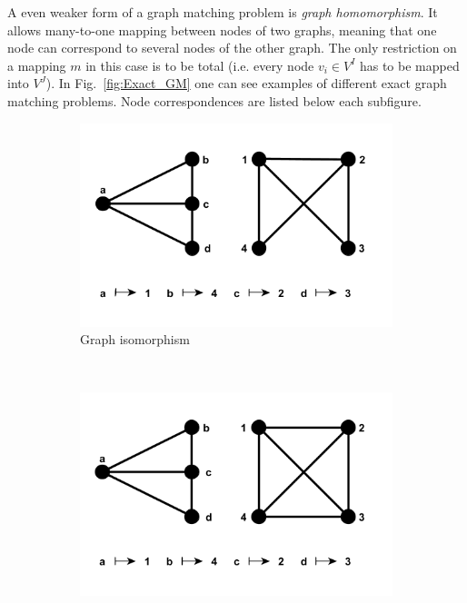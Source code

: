 A even weaker form of a graph matching problem is \emph{graph homomorphism}. It allows many-to-one mapping between nodes of two graphs, meaning that one node can correspond to several nodes of the other graph. The only restriction on a mapping $m$ in this case is to be total (i.e. every node $v_i\in V^I$ has to be mapped into $V^J$).
In Fig.~\ref{fig:Exact_GM} one can see examples of different exact graph matching problems. Node correspondences are listed below each subfigure.
\begin{figure}[h!]
    \centering
    \begin{subfigure}[b]{0.3\textwidth}
        \includegraphics[width=\textwidth]{chapter1/fig/GI}
        \caption{Graph isomorphism}
        \label{fig:GI}
    \end{subfigure}
    ~
    \begin{subfigure}[b]{0.3\textwidth}
        \includegraphics[width=\textwidth]{chapter1/fig/monomorphism}

\end{subfigure}
\end{figure}
